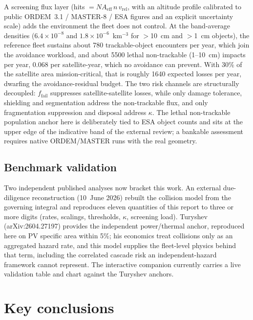 \documentclass[11pt,a4paper]{article}
\begin{document}
A screening flux layer (hits $= N A_{\mathrm{eff}}\, n\, v_{\mathrm{rel}}$, with an
altitude profile calibrated to public ORDEM~3.1 / MASTER-8 / ESA figures and an
explicit uncertainty scale) adds the environment the fleet does not control. At
the band-average densities ($6.4\times10^{-8}$ and $1.8\times10^{-6}$~km$^{-3}$
for $>$10~cm and $>$1~cm objects), the reference fleet sustains about 780
trackable-object encounters per year, which join the avoidance workload, and about
5500 lethal non-trackable (1--10~cm) impacts per year, 0.068 per satellite-year,
which no avoidance can prevent. With 30\% of the satellite area mission-critical,
that is roughly 1640 expected losses per year, dwarfing the avoidance-residual
budget. The two risk channels are structurally decoupled: $f_{\mathrm{fail}}$
suppresses satellite-satellite losses, while only damage tolerance, shielding and
segmentation address the non-trackable flux, and only fragmentation suppression
and disposal address $\kappa$. The lethal non-trackable population anchor here is
deliberately tied to ESA object counts and sits at the upper edge of the indicative
band of the external review; a bankable assessment requires native ORDEM/MASTER
runs with the real geometry.

\subsection{Benchmark validation}

Two independent published analyses now bracket this work. An external
due-diligence reconstruction (10~June 2026) rebuilt the collision model from the
governing integral and reproduces eleven quantities of this report to three or
more digits (rates, scalings, thresholds, $\kappa$, screening load). Turyshev
(arXiv:2604.27197) provides the independent power/thermal anchor, reproduced here
on PV specific area within 5\%; his economics treat collisions only as an
aggregated hazard rate, and this model supplies the fleet-level physics behind
that term, including the correlated cascade risk an independent-hazard framework
cannot represent. The interactive companion currently carries a live validation
table and chart against the Turyshev anchors.

\section{Key conclusions}
\end{document}
